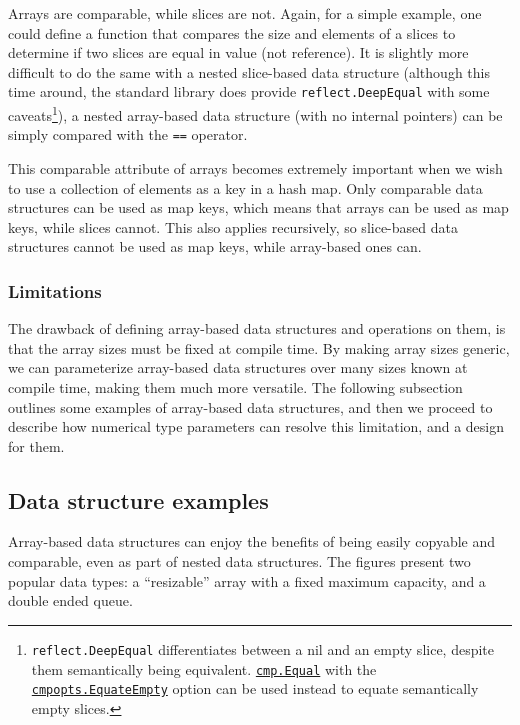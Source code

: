 Arrays are comparable, while slices are not. Again, for a simple example, one
could define a function that compares the size and elements of a slices to
determine if two slices are equal in value (not reference). It is slightly more
difficult to do the same with a nested slice-based data structure (although this
time around, the standard library does provide \texttt{reflect.DeepEqual} with
some caveats\footnote{\texttt{reflect.DeepEqual} differentiates between a nil
	and an empty slice, despite them semantically being equivalent.
	\href{https://pkg.go.dev/github.com/google/go-cmp/cmp\#Equal}{\texttt{cmp.Equal}}
	with the
	\href{https://pkg.go.dev/github.com/google/go-cmp/cmp/cmpopts\#EquateEmpty}{\texttt{cmpopts.EquateEmpty}}
	option can be used instead to equate semantically empty slices.}),
a nested array-based data structure (with no internal pointers) can be simply
compared with the \texttt{==} operator.

This comparable attribute of arrays becomes extremely important when we wish to
use a collection of elements as a key in a hash map. Only comparable data
structures can be used as map keys, which means that arrays can be used as map
keys, while slices cannot. This also applies recursively, so slice-based data
structures cannot be used as map keys, while array-based ones can.

\subsubsection{Limitations}

The drawback of defining array-based data structures and operations on them, is
that the array sizes must be fixed at compile time. By making array sizes
generic, we can parameterize array-based data structures over many sizes known
at compile time, making them much more versatile. The following subsection
outlines some examples of array-based data structures, and then we proceed to
describe how numerical type parameters can resolve this limitation, and a design
for them.

\subsection{Data structure examples}

Array-based data structures can enjoy the benefits of being easily copyable and
comparable, even as part of nested data structures. The figures present two
popular data types: a ``resizable'' array with a fixed maximum capacity, and a
double ended queue.

